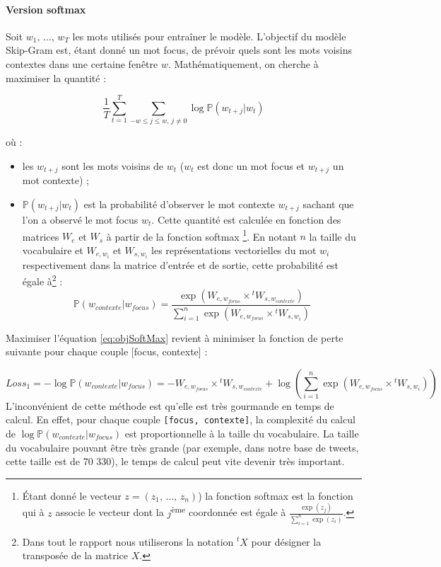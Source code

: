 \documentclass[11pt,french,french]{article}
\let\rmarkdownfootnote\footnote%
\def\footnote{\protect\rmarkdownfootnote}
\begin{document}
\paragraph{Version softmax}\label{subsec:softmax}

Soit \(w_1,\,\dots,\,w_T\) les mots utilisés pour entraîner le modèle.
L'objectif du modèle Skip-Gram est, étant donné un mot focus, de prévoir
quels sont les mots voisins contextes dans une certaine fenêtre \(w\).
Mathématiquement, on cherche à maximiser la quantité :

\begin{equation*}
\frac 1 T\sum_{t=1}^T\sum_{-w\leq j \leq w,\,j\ne 0} \log \mathbb P(w_{t+j}\vert w_{t})
\label{eq:objSoftMax}
\end{equation*}

où :

\begin{itemize}
\item
  les \(w_{t+j}\) sont les mots voisins de \(w_t\) (\(w_t\) est donc un
  mot focus et \(w_{t+j}\) un mot contexte) ;
\item
  \(\mathbb P(w_{t+j}\vert w_{t})\) est la probabilité d'observer le mot
  contexte \(w_{t+j}\) sachant que l'on a observé le mot focus \(w_t\).
  Cette quantité est calculée en fonction des matrices \(W_e\) et
  \(W_s\) à partir de la fonction softmax \footnote{Étant donné le
    vecteur \(z=(z_1,\,\dots,\,z_n)\)) la fonction softmax est la
    fonction qui à \(z\) associe le vecteur dont la
    \(j\)\textsuperscript{ème} coordonnée est égale à
    \(\frac{\exp(z_j)}{\sum_{i=1}^n\exp(z_i)}\).}. En notant \(n\) la
  taille du vocabulaire et \(W_{e,w_i}\) et \(W_{s,w_i}\) les
  représentations vectorielles du mot \(w_i\) respectivement dans la
  matrice d'entrée et de sortie, cette probabilité est égale à\footnote{Dans
    tout le rapport nous utiliserons la notation \(^{t}X\) pour désigner
    la transposée de la matrice \(X\).} : \[
  \mathbb P(w_{contexte}\vert w_{focus}) = 
  \frac{
  \exp(W_{e,w_{focus}}\times {}^tW_{s,w_{contexte}})
  }{
  \sum_{i=1}^n\exp(W_{e,w_{focus}}\times {}^tW_{s,w_{i}})
  }
  \]
\end{itemize}

Maximiser l'équation \eqref{eq:objSoftMax} revient à minimiser la fonction
de perte suivante pour chaque couple {[}focus, contexte{]} :

\[
Loss_{1}=-\log\mathbb P(w_{contexte}\vert w_{focus}) =
-W_{e,w_{focus}}\times {}^tW_{s,w_{contexte}}+
\log\left(\sum_{i=1}^n\exp(W_{e,w_{focus}}\times {}^t W_{s,w_i})\right)
\] L'inconvénient de cette méthode est qu'elle est très gourmande en
temps de calcul. En effet, pour chaque couple
\texttt{{[}focus,\ contexte{]}}, la complexité du calcul de
\(\log\mathbb P(w_{contexte}\vert w_{focus})\) est proportionnelle à la
taille du vocabulaire. La taille du vocabulaire pouvant être très grande
(par exemple, dans notre base de tweets, cette taille est de 70 330), le
temps de calcul peut vite devenir très important.
\end{document}
